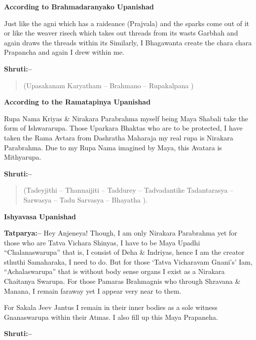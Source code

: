 \begin{flushright}
\textbf{According to Brahmadaranyako Upanishad}
\end{flushright}

Just like the agni which has a raideance (Prajvala) and the sparks come out of it or like the weaver risech which takes out threads from its wasts Garbhah and again draws the threads within its Similarly, I Bhagawanta create the chara chara Prapancha and again I drew within me.

\textbf{Shruti:–}

\begin{verse}
(Upasakanam Karyatham – Brahmano – Rupakalpana )
\end{verse}

\begin{flushright}
\textbf{According to the Ramatapinya Upanishad}
\end{flushright}

Rupa Nama Kriyas \& Nirakara Parabrahma myself being Maya Shabali take the form of Ishwararupa. Those Uparkara Bhaktas who are to be protected, I have taken the Rama Avtara from Dashratha Maharaja my real rupa is Nirakara Parabrahma. Due to my Rupa Nama imagined by Maya, this Avatara is Mithyarupa.

\textbf{Shruti:–}

\begin{verse}
(Tadeyjithi – Thannaijiti – Taddurey – Tadvadantike  Tadantarasya – Sarwasya – Tadu Sarvasya – Bhayatha ).
\end{verse}

\begin{flushright}
\textbf{Ishyavasa Upanishad}
\end{flushright}

\textbf{Tatparya:–} Hey Anjeneya! Though, I am only Nirakara Parabrahma yet for those who are Tatva Vichara Shinyas, I have to be Maya Upadhi “Chalanaswarupa” that is, I consist of Deha \& Indriyas, hence I am the creator sthuthi Samaharaka, I need to do. But for those ‘Tatva Vicharavam Gnani's’ Iam, “Achalaswarupa” that is without body sense organs I exist as a Nirakara Chaitanya Swarupa. For those Pamaras Brahmagnis who through Shravana \& Manana, I remain faraway yet I appear very near to them.

For Sakala Jeev Jantus I remain in their inner bodies as a sole witness Gnanaswarupa within their Atmas. I also fill up this Maya Prapaneha.

\textbf{Shruti:–}

